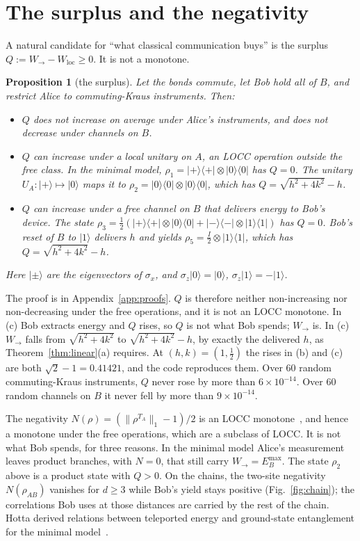 \documentclass[aps,pra,twocolumn,reprint,superscriptaddress,nofootinbib,floatfix]{revtex4-2}
\theoremstyle{plain}
\newtheorem{proposition}{Proposition}
\theoremstyle{remark}
\newcommand{\Wto}{W_{\to}}
\newcommand{\Wloc}{W_{\mathrm{loc}}}
\newcommand{\ket}[1]{|#1\rangle}
\newcommand{\proj}[1]{|#1\rangle\langle #1|}
\begin{document}
\section{The surplus and the negativity}
\label{sec:surplus}

A natural candidate for ``what classical communication buys'' is the surplus
$Q:=\Wto-\Wloc\ge0$. It is not a monotone.

\begin{proposition}[the surplus]
\label{prop:surplus}
Let the bonds commute, let Bob hold all of $B$, and restrict Alice to commuting-Kraus
instruments. Then:
\begin{itemize}
\item[(a)] $Q$ does not increase on average under Alice's instruments, and does not
decrease under channels on $B$.
\item[(b)] $Q$ can increase under a local unitary on $A$, an LOCC operation outside the free
class. In the minimal model, $\rho_1=\proj{+}\otimes\proj0$ has $Q=0$. The unitary
$U_A:\ket+\mapsto\ket0$ maps it to $\rho_2=\proj0\otimes\proj0$, which has
$Q=\sqrt{h^2+4k^2}-h$.
\item[(c)] $Q$ can increase under a free channel on $B$ that delivers energy to Bob's device.
The state $\rho_3=\tfrac12(\proj+\otimes\proj0+\proj-\otimes\proj1)$ has $Q=0$. Bob's reset
of $B$ to $\ket1$ delivers $h$ and yields $\rho_5=\tfrac{I}{2}\otimes\proj1$, which has
$Q=\sqrt{h^2+4k^2}-h$.
\end{itemize}
Here $\ket\pm$ are the eigenvectors of $\sigma_x$, and $\sigma_z\ket0=\ket0$,
$\sigma_z\ket1=-\ket1$.
\end{proposition}

The proof is in Appendix~\ref{app:proofs}. $Q$ is therefore neither non-increasing nor
non-decreasing under the free operations, and it is not an LOCC monotone. In (c) Bob
extracts energy and $Q$ rises, so $Q$ is not what Bob spends; $\Wto$ is. In (c) $\Wto$ falls
from $\sqrt{h^2+4k^2}$ to $\sqrt{h^2+4k^2}-h$, by exactly the delivered $h$, as
Theorem~\ref{thm:linear}(a) requires. At $(h,k)=(1,\tfrac12)$ the rises in (b) and (c) are
both $\sqrt2-1=0.41421$, and the code reproduces them. Over 60 random commuting-Kraus
instruments, $Q$ never rose by more than $6\times10^{-14}$. Over 60 random channels on $B$ it
never fell by more than $9\times10^{-14}$.

The negativity $N(\rho)=(\|\rho^{T_A}\|_1-1)/2$ is an LOCC monotone~\cite{VidalWerner2002}, and
hence a monotone under the free operations, which are a subclass of LOCC. It is not what Bob
spends, for three reasons. In the minimal model Alice's measurement leaves product branches,
with $N=0$, that still carry $\Wto=E_B^{\max}$. The state $\rho_2$ above is a product state
with $Q>0$. On the chains, the two-site negativity $N(\rho_{AB})$ vanishes for $d\ge3$ while
Bob's yield stays positive (Fig.~\ref{fig:chain}); the correlations Bob uses at those
distances are carried by the rest of the chain. Hotta derived relations between teleported
energy and ground-state entanglement for the minimal model~\cite{Hotta2010}.
\end{document}
